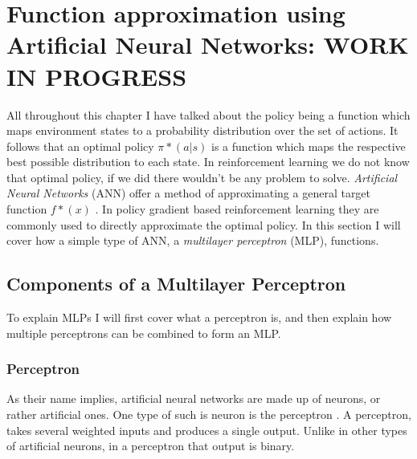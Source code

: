 \newpage
\section{Function approximation using Artificial Neural Networks: WORK IN PROGRESS}\label{sec:neural_networks}
All throughout this chapter I have talked about the policy being a function which maps environment states to a probability distribution over the set of actions. It follows that an optimal policy $\pi*(a|s)$ is a function which maps the respective best possible distribution to each state. In reinforcement learning we do not know that optimal policy, if we did there wouldn't be any problem to solve. \textit{Artificial Neural Networks} (ANN) offer a method of approximating a general target function $f*(x)$ \cite[p. 164]{Goodfellow-et-al-2016}. In policy gradient based reinforcement learning they are commonly used to directly approximate the optimal policy. In this section I will cover how a simple type of ANN, a \textit{multilayer perceptron} (MLP), functions.

\subsection{Components of a Multilayer Perceptron}\label{subsec:nn:components_mlp}
To explain MLPs I will first cover what a perceptron is, and then explain how multiple perceptrons can be combined to form an MLP.

\subsubsection{Perceptron}\label{subsubsec:nn:comp:perceptron}
As their name implies, artificial neural networks are made up of neurons, or rather artificial ones. One type of such is neuron is the perceptron \cite[chap. 1]{nielsen_neural_2015}. A perceptron, takes several weighted inputs and produces a single output. Unlike in other types of artificial neurons, in a perceptron that output is binary. 

